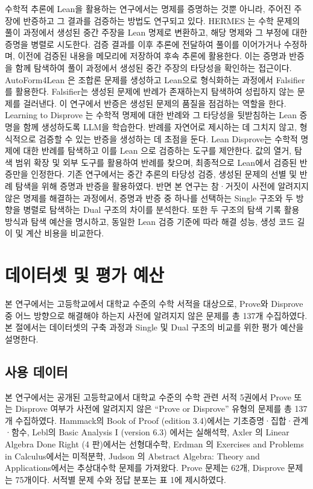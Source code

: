 \documentclass[a4paper,9pt,twocolumn]{extarticle}
\begin{document}
수학적 추론에 Lean을 활용하는 연구에서는 명제를 증명하는 것뿐 아니라, 주어진 주장에 반증하고 그 결과를 검증하는 방법도 연구되고 있다.
HERMES \cite{r5}는 수학 문제의 풀이 과정에서 생성된 중간 주장을 Lean 명제로 변환하고, 해당 명제와 그 부정에 대한 증명을 병렬로 시도한다. 검증 결과를 이후 추론에 전달하여 풀이를 이어가거나 수정하며, 이전에 검증된 내용을 메모리에 저장하여 후속 추론에 활용한다. 이는 증명과 반증을 함께 탐색하여 풀이 과정에서 생성된 중간 주장의 타당성을 확인하는 접근이다.
AutoForm4Lean \cite{r6}은 조합론 문제를 생성하고 Lean으로 형식화하는 과정에서 Falsifier를 활용한다. Falsifier는 생성된 문제에 반례가 존재하는지 탐색하여 성립하지 않는 문제를 걸러낸다. 이 연구에서 반증은 생성된 문제의 품질을 점검하는 역할을 한다.
Learning to Disprove \cite{r7}는 수학적 명제에 대한 반례와 그 타당성을 뒷받침하는 Lean 증명을 함께 생성하도록 LLM을 학습한다. 반례를 자연어로 제시하는 데 그치지 않고, 형식적으로 검증할 수 있는 반증을 생성하는 데 초점을 둔다.
Lean Disprove\cite{r8}는 수학적 명제에 대한 반례를 탐색하고 이를 Lean 으로 검증하는 도구를 제안한다. 값의 열거, 탐색 범위 확장 및 외부 도구를 활용하여 반례를 찾으며, 최종적으로 Lean에서 검증된 반증만을 인정한다.
기존 연구에서는 중간 추론의 타당성 검증, 생성된 문제의 선별 및 반례 탐색을 위해 증명과 반증을 활용하였다. 반면 본 연구는 참·거짓이 사전에 알려지지 않은 명제를 해결하는 과정에서, 증명과 반증 중 하나를 선택하는 Single 구조와 두 방향을 병렬로 탐색하는 Dual 구조의 차이를 분석한다. 또한 두 구조의 탐색 기록 활용 방식과 탐색 예산을 명시하고, 동일한 Lean 검증 기준에 따라 해결 성능, 생성 코드 길이 및 계산 비용을 비교한다.

\section{데이터셋 및 평가 예산}


본 연구에서는 고등학교에서 대학교 수준의 수학 서적을 대상으로, Prove와 Disprove 중 어느 방향으로 해결해야 하는지 사전에 알려지지 않은 문제를 총 137개 수집하였다. 본 절에서는 데이터셋의 구축 과정과 Single 및 Dual 구조의 비교를 위한 평가 예산을 설명한다.

\subsection{사용 데이터}


본 연구에서는 공개된 고등학교에서 대학교 수준의 수학 관련 서적 5권에서 Prove 또는 Disprove 여부가 사전에 알려지지 않은 “Prove or Disprove” 유형의 문제를 총 137개 수집하였다. Hammack의 Book of Proof (edition 3.4)\cite{r9}에서는 기초증명·집합·관계·함수, Lebl의 Basic Analysis I (version 6.3) \cite{r10}에서는 실해석학, Axler 의 Linear Algebra Done Right (4 판)\cite{r11}에서는 선형대수학, Erdman 의 Exercises and Problems in Calculus\cite{r12}에서는 미적분학, Judson 의 Abstract Algebra: Theory and Applications\cite{r13}에서는 추상대수학 문제를 가져왔다. Prove 문제는 62개, Disprove 문제는 75개이다. 서적별 문제 수와 정답 분포는 표 1에 제시하였다.
\end{document}
